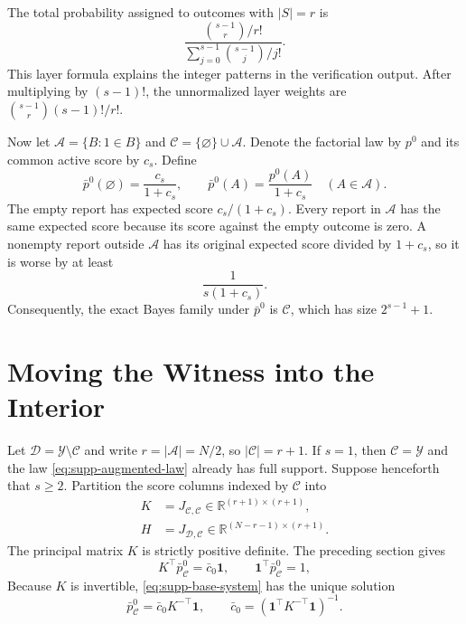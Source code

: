 \documentclass[twoside]{article}
\newcommand{\Y}{\mathcal Y}
\newcommand{\1}{\mathbf 1}
\begin{document}
The total probability assigned to outcomes with $|S|=r$ is
\begin{equation}
\frac{\binom{s-1}{r}/r!}{\sum_{j=0}^{s-1}\binom{s-1}{j}/j!}.
\end{equation}
This layer formula explains the integer patterns in the verification output. After multiplying by $(s-1)!$, the unnormalized layer weights are $\binom{s-1}{r}(s-1)!/r!$.

Now let $\mathcal A=\{B:1\in B\}$ and $\mathcal C=\{\varnothing\}\cup\mathcal A$. Denote the factorial law by $p^0$ and its common active score by $c_s$. Define
\begin{equation}
\bar p^0(\varnothing)=\frac{c_s}{1+c_s},
\qquad
\bar p^0(A)=\frac{p^0(A)}{1+c_s}\quad(A\in\mathcal A).
\label{eq:supp-augmented-law}
\end{equation}
The empty report has expected score $c_s/(1+c_s)$. Every report in $\mathcal A$ has the same expected score because its score against the empty outcome is zero. A nonempty report outside $\mathcal A$ has its original expected score divided by $1+c_s$, so it is worse by at least
\begin{equation}
\frac1{s(1+c_s)}.
\label{eq:supp-augmented-gap}
\end{equation}
Consequently, the exact Bayes family under $\bar p^0$ is $\mathcal C$, which has size $2^{s-1}+1$.

\section{Moving the Witness into the Interior}

Let $\mathcal D=\Y\setminus\mathcal C$ and write $r=|\mathcal A|=N/2$, so $|\mathcal C|=r+1$. If $s=1$, then $\mathcal C=\Y$ and the law \eqref{eq:supp-augmented-law} already has full support. Suppose henceforth that $s\geq2$. Partition the score columns indexed by $\mathcal C$ into
\begin{align}
K&=J_{\mathcal C,\mathcal C}\in\mathbb R^{(r+1)\times(r+1)},\\
H&=J_{\mathcal D,\mathcal C}\in\mathbb R^{(N-r-1)\times(r+1)}.
\end{align}
The principal matrix $K$ is strictly positive definite. The preceding section gives
\begin{equation}
K^\top \bar p^0_{\mathcal C}=\bar c_0\1,
\qquad
\1^\top \bar p^0_{\mathcal C}=1,
\label{eq:supp-base-system}
\end{equation}
Because $K$ is invertible, \eqref{eq:supp-base-system} has the unique solution
\begin{equation}
\bar p^0_{\mathcal C}=\bar c_0K^{-\top}\1,
\qquad
\bar c_0=(\1^\top K^{-\top}\1)^{-1}.
\label{eq:supp-base-unique}
\end{equation}
\end{document}
